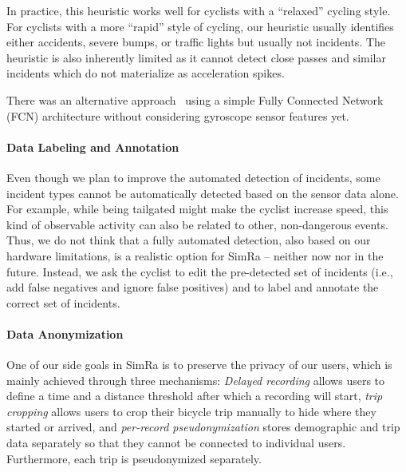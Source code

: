 In practice, this heuristic works well for cyclists with a ``relaxed'' cycling style.
For cyclists with a more ``rapid'' style of cycling, our heuristic usually identifies either accidents, severe bumps, or traffic lights but usually not incidents.
The heuristic is also inherently limited as it cannot detect close passes and similar incidents which do not materialize as acceleration spikes.

There was an alternative approach~\cite{sanchez2020detecting} using a simple Fully Connected Network (FCN) architecture without considering gyroscope sensor features yet.

\paragraph{Data Labeling and Annotation}

Even though we plan to improve the automated detection of incidents, some incident types cannot be automatically detected based on the sensor data alone.
For example, while being tailgated might make the cyclist increase speed, this kind of observable activity can also be related to other, non-dangerous events.
Thus, we do not think that a fully automated detection, also based on our hardware limitations, is a realistic option for SimRa -- neither now nor in the future.
Instead, we ask the cyclist to edit the pre-detected set of incidents (i.e., add false negatives and ignore false positives) and to label and annotate the correct set of incidents.

\paragraph{Data Anonymization}

One of our side goals in SimRa is to preserve the privacy of our users, which is mainly achieved through three mechanisms: \emph{Delayed recording} allows users to define a time and a distance threshold after which a recording will start, \emph{trip cropping} allows users to crop their bicycle trip manually to hide where they started or arrived, and \emph{per-record pseudonymization} stores demographic and trip data separately so that they cannot be connected to individual users. Furthermore, each trip is pseudonymized separately.





